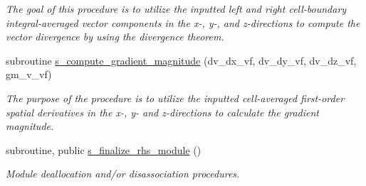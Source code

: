 \begin{DoxyCompactItemize}
\begin{DoxyCompactList}\small\item\em The goal of this procedure is to utilize the inputted left and right cell-\/boundary integral-\/averaged vector components in the x-\/, y-\/, and z-\/directions to compute the vector divergence by using the divergence theorem. \end{DoxyCompactList}\item 
subroutine \hyperlink{namespacem__rhs_ab733571c02acf3c3d16b0bfbed34b79e}{s\+\_\+compute\+\_\+gradient\+\_\+magnitude} (dv\+\_\+dx\+\_\+vf, dv\+\_\+dy\+\_\+vf, dv\+\_\+dz\+\_\+vf, gm\+\_\+v\+\_\+vf)
\begin{DoxyCompactList}\small\item\em The purpose of the procedure is to utilize the inputted cell-\/averaged first-\/order spatial derivatives in the x-\/, y-\/ and z-\/directions to calculate the gradient magnitude. \end{DoxyCompactList}\item 
subroutine, public \hyperlink{namespacem__rhs_a73fc1430500bdd1786b121a9ed08a107}{s\+\_\+finalize\+\_\+rhs\+\_\+module} ()
\begin{DoxyCompactList}\small\item\em Module deallocation and/or disassociation procedures. \end{DoxyCompactList}\end{DoxyCompactItemize}

